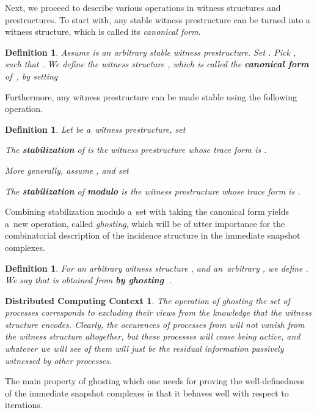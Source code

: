 \documentclass{amsart}[10pt]
\newtheorem{df}[theorem]{Definition}
\newtheorem{dcc}[theorem]{Distributed Computing Context}
\numberwithin{equation}{section}
\numberwithin{figure}{section}
\numberwithin{table}{section}
\begin{document}
Next, we proceed to describe various operations in witness structures
and prestructures. To start with, any stable witness prestructure can
be turned into a witness structure, which is called its {\it canonical
  form}.

\begin{df}\label{df:cform}
Assume  is an arbitrary stable
witness prestructure. Set .  Pick , such that
.  We define
the witness structure , which is called the {\bf
  canonical form} of~, by setting

\end{df}


Furthermore, any witness prestructure can be made stable using the
following operation.

\begin{df} \label{df:st}
Let  be a~witness prestructure,
set

The {\bf stabilization} of  is the witness prestructure
 whose trace form is .

More generally, assume , and set

The {\bf stabilization} of  {\bf modulo}  is the witness
prestructure  whose trace form is .
\end{df}

Combining stabilization modulo a~set with taking the canonical form
yields a~new operation, called {\it ghosting}, which will be of utter
importance for the combinatorial description of the incidence
structure in the immediate snapshot complexes.

\begin{df}\label{df:go}
For an arbitrary witness structure , and an~arbitrary
, we define
. We say that 
is obtained from  {\bf by ghosting~}.
\end{df}

\begin{dcc}\label{dcc:4}
The operation of ghosting the set of processes  corresponds to
excluding their views from the knowledge that the witness structure
encodes. Clearly, the occurences of processes from  will not vanish
from the witness structure  altogether, but these
processes will cease being active, and whatever we will see of them
will just be the residual information passively witnessed by other
processes.
\end{dcc}

The main property of ghosting which one needs for proving the
well-definedness of the immediate snapshot complexes is that it
behaves well with respect to iterations.
\end{document}
